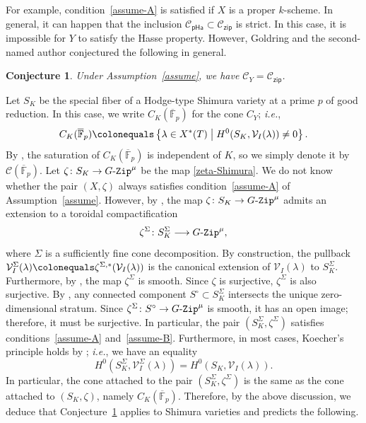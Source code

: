 \documentclass[11pt]{amsart}
\numberwithin{equation}{section}
\newtheorem{conjecture}[theorem]{Conjecture}
\theoremstyle{definition}
\theoremstyle{remark}
\newcommand{\GZip}{\mathop{\text{$G$-{\tt Zip}}}\nolimits}
\newcommand{\pha}{\mathsf{pHa}}
\newcommand{\zipsf}{\mathsf{zip}}
\newcommand{\Ccal}{{\mathcal C}}
\newcommand{\Vcal}{{\mathcal V}}
\newcommand{\FF}{\mathbb{F}}
\newcommand{\relmiddle}[1]{\mathrel{}\middle#1\mathrel{}}
\newcommand{\lra}{\longrightarrow}
\begin{document}
For example, condition~\eqref{assume-A} is satisfied if $X$ is a proper $k$-scheme. In general, it can happen that the inclusion $\Ccal_{\pha}\subset \Ccal_{\zipsf}$ is strict. In this case, it is impossible for $Y$ to satisfy the Hasse property. However, Goldring and the second-named author conjectured the following in general. 

\begin{conjecture}\label{conj-Czip}
Under Assumption~\ref{assume}, we have $\Ccal_Y = \Ccal_{\zipsf}$.
\end{conjecture}

Let $S_K$ be the special fiber of a Hodge-type Shimura variety at a prime $p$ of good reduction. In this case, we write $C_K(\overline{\FF}_p)$ for the cone $C_Y$; \textit{i.e.}, 
\begin{equation}\label{cone-CKFp}
    C_K(\overline{\FF}_p) \colonequals \left\{\lambda\in X^*(T) \relmiddle| H^0(S_K,\Vcal_I(\lambda))\neq 0\right\}.
\end{equation}
By \cite[Corollary 1.5.3]{Koskivirta-automforms-GZip}, the saturation of $C_K(\overline{\FF}_p)$ is independent of $K$, so we simply denote it by $\Ccal(\overline{\FF}_p)$. Let $\zeta\colon S_K\to \GZip^\mu$ be the map \eqref{zeta-Shimura}. We do not know whether the pair $(X,\zeta)$ always satisfies condition~\eqref{assume-A}  of Assumption~\ref{assume}. However, by \cite[Theorem 6.2.1]{Goldring-Koskivirta-Strata-Hasse}, the map $\zeta\colon S_K\to \GZip^\mu$  admits an extension to a toroidal compactification
\begin{equation}
    \zeta^\Sigma\colon S_{K}^{\Sigma}\lra \GZip^\mu, 
\end{equation}
where $\Sigma$ is a sufficiently fine cone decomposition. By construction, the pullback $\Vcal_I^\Sigma(\lambda)\colonequals \zeta^{\Sigma,*}(\Vcal_I(\lambda))$ is the canonical extension of $\Vcal_I(\lambda)$ to $S_K^\Sigma$. Furthermore, by \cite[Theorem 1.2]{Andreatta-modp-period-maps}, the map $\zeta^\Sigma$ is smooth. Since $\zeta$ is surjective, $\zeta^\Sigma$ is also surjective. By \cite[Proposition 6.20]{Wedhorn-Ziegler-tautological}, any connected component $S^\circ\subset S_{K}^{\Sigma}$ intersects the unique zero-dimensional stratum. Since $\zeta^\Sigma \colon S^\circ \to \GZip^\mu$ is smooth, it has an open image; therefore,  it must be surjective. In particular, the pair $(S_{K}^{\Sigma},\zeta^\Sigma)$ satisfies conditions~\eqref{assume-A} and~\eqref{assume-B}. Furthermore, in most cases, Koecher's principle holds by \cite[Theorem 2.5.11]{Lan-Stroh-stratifications-compactifications}; \textit{i.e.}, we have an equality
\begin{equation}
    H^0\left(S^{\Sigma}_K, \Vcal^{\Sigma}_I(\lambda)\right) = H^0\left(S_K,\Vcal_I(\lambda)\right).
\end{equation}
In particular, the cone attached to the pair $(S_{K}^{\Sigma},\zeta^\Sigma)$ is the same as the cone attached to $(S_K,\zeta)$, namely $C_K(\overline{\FF}_p)$. Therefore, by the above discussion, we deduce that Conjecture~\ref{conj-Czip} applies to Shimura varieties and predicts the following. 
\end{document}
